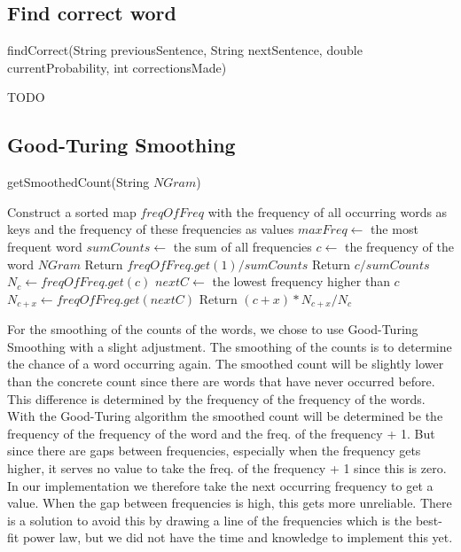 \documentclass[a4paper,twoside,11pt]{article}
\begin{document}
\subsection{Find correct word}
\begin{algorithm}[H]
\caption{findCorrect(String previousSentence, String nextSentence, double currentProbability, int correctionsMade)}
\begin{algorithmic}
\State TODO
\end{algorithmic}
\end{algorithm}

\subsection{Good-Turing Smoothing}
\begin{algorithm} [H]
\caption{getSmoothedCount(String $NGram$)}\label{euclid}
\begin{algorithmic}
\State Construct a sorted map $freqOfFreq$ with the frequency of all occurring words as keys and the frequency of these frequencies as values
\State $maxFreq \gets$ the most frequent word
\State $sumCounts \gets$ the sum of all frequencies
\State $c \gets$ the frequency of the word $NGram$
  \State Return $freqOfFreq.get(1) / sumCounts$
  \State Return $c / sumCounts$
\Else
  \State $N_c \gets freqOfFreq.get(c)$
  \State $nextC \gets$ the lowest frequency higher than $c$
  \State $N_{c+x} \gets freqOfFreq.get(nextC)$
  \State Return $(c + x) * N_{c+x} / N_c$
\EndIf
\end{algorithmic}
\end{algorithm}

For the smoothing of the counts of the words, we chose to use Good-Turing Smoothing with a slight adjustment. The smoothing of the counts is to determine the chance of a word occurring again. The smoothed count will be slightly lower than the concrete count since there are words that have never occurred before. This difference is determined by the frequency of the frequency of the words. With the Good-Turing algorithm the smoothed count will be determined be the frequency of the frequency of the word and the freq. of the frequency + 1. But since there are gaps between frequencies, especially when the frequency gets higher, it serves no value to take the freq. of the frequency + 1 since this is zero. In our implementation we therefore take the next occurring frequency to get a value. When the gap between frequencies is high, this gets more unreliable. There is a solution to avoid this by drawing a line of the frequencies which is the best-fit power law, but we did not have the time and knowledge to implement this yet.
\end{document}
